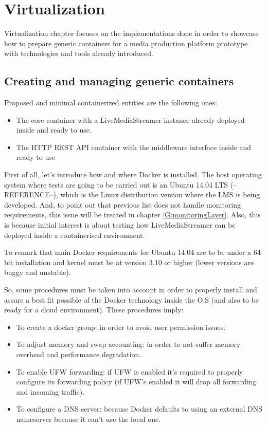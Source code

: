\chapter{Virtualization}\label{D:virtualization}

Virtualization chapter focuses on the implementations done in order to showcase how to prepare generic containers for a media production platform prototype with technologies and tools already introduced. 

\section{Creating and managing generic containers}
Proposed and minimal containerized entities are the following ones:

\begin{itemize}
\item The core container with a LiveMediaStreamer instance already deployed inside and ready to use.
\item The HTTP REST API container with the middleware interface inside and ready to use
\end{itemize}

First of all, let's introduce how and where Docker is installed. The host operating system where tests are going to be carried out is an Ubuntu 14.04 LTS (--REFERENCE--), which is the Linux distribution version where the LMS is being developed. And, to point out that previous list does not handle monitoring requirements, this issue will be treated in chapter \ref{G:monitoringLayer}. Also, this is because initial interest is about testing how LiveMediaStreamer can be deployed inside a containerised environment.

To remark that main Docker requirements for Ubuntu 14.04 are to be under a 64-bit installation and kernel must be at version 3.10 or higher (lower versions are buggy and unstable). 

So, some procedures must be taken into account in order to properly install and assure a best fit possible of the Docker technology inside the O.S (and also to be ready for a cloud environment). These procedures imply:

\begin{itemize}
\item To create a docker group: in order to avoid user permission issues.
\item To adjust memory and swap accounting: in order to not suffer memory overhead and performance degradation.
\item To enable UFW forwarding: if UFW is enabled it's required to properly configure its forwarding policy (if UFW's enabled it will drop all forwarding and incoming traffic).
\item To configure a DNS server: because Docker defaults to using an external DNS nameserver because it can't use the local one.
\end{itemize}

